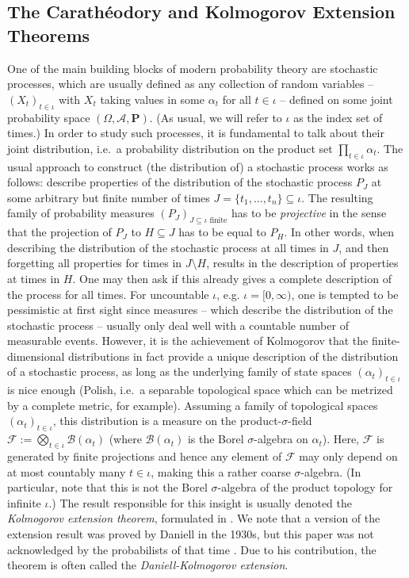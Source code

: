 \documentclass[lean]{DraftAFM}
\begin{document}
\subsection{The Carathéodory and Kolmogorov Extension Theorems}
One of the main building blocks of modern probability theory are stochastic processes, which are usually defined as any collection of random variables -- $(X_t)_{t\in \iota}$ with $X_t$ taking values in some $\alpha_t$ for all $t\in\iota$ -- defined on some joint probability space $(\Omega, \mathcal A, \mathbf P)$.  (As usual, we will refer to $\iota$ as the index set of times.) In order to study such processes, it is fundamental to talk about their joint distribution, i.e.\ a probability distribution on the product set $\prod_{t\in\iota} \alpha_t$. The usual approach to construct (the distribution of) a stochastic process works as follows: describe properties of the distribution of the stochastic process $P_J$ at some arbitrary but finite number of times $J = \{t_1,...,t_n\} \subseteq \iota$.
The resulting family of probability measures $(P_J)_{J \subseteq \iota \text{ finite}}$ has to be {\em projective} in the sense that the projection of $P_J$ to $H\subseteq J$ has to be equal to $P_H$. In other words, when describing the distribution of the stochastic process at all times in $J$, and then forgetting all properties for times in $J\setminus H$, results in the description of properties at times in $H$. One may then ask if this already gives a complete description of the process for all times.
For uncountable $\iota$, e.g. $\iota = [0,\infty)$, one is tempted to be pessimistic at first sight since measures -- which describe the distribution of the stochastic process -- usually only deal well with a countable number of measurable events. However, it is the achievement of Kolmogorov that the finite-dimensional distributions in fact provide a unique description of the distribution of a stochastic process, as long as the underlying family of state spaces $(\alpha_t)_{t\in\iota}$ is nice enough (Polish, i.e.\ a separable topological space which can be metrized by a complete metric, for example).
Assuming a family of topological spaces $(\alpha_t)_{t\in\iota}$, this distribution is a measure on the product-$\sigma$-field $\mathcal F :=\bigotimes_{t\in\iota} \mathcal B(\alpha_t)$ (where $\mathcal B(\alpha_t)$ is the Borel $\sigma$-algebra on $\alpha_t$). Here, $\mathcal F$ is generated by finite projections and hence any element of $\mathcal F$ may only depend on at most countably many $t\in \iota$, making this a rather coarse $\sigma$-algebra. (In particular, note that this is not the Borel $\sigma$-algebra of the product topology for infinite $\iota$.) The result responsible for this insight is usually denoted the {\em Kolmogorov extension theorem}, formulated in \cite{kolmogoroff1933grundbegriffe}. We note that a version of the extension result was proved by Daniell in the 1930s, but this paper was not acknowledged by the probabilists of that time \cite{aldrich2007but}. Due to his contribution, the theorem is often called the {\em Daniell-Kolmogorov extension}.
\end{document}
